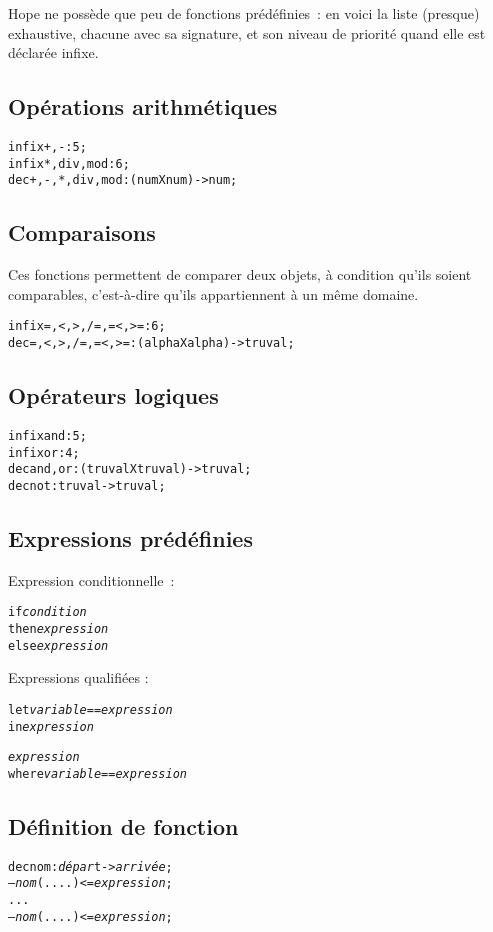 Hope ne possède que peu de fonctions prédéfinies~: en voici la liste
(presque) exhaustive, chacune avec sa signature, et son niveau de
priorité quand elle est déclarée infixe.

\subsection*{Opérations arithmétiques }
\begin{alltt}
infix + , -  : 5 ;
infix * , div , mod : 6 ;
dec + , - , * , div , mod  : (num X num) -> num ;
\end{alltt}

\subsection*{Comparaisons}
	Ces fonctions permettent de comparer deux objets, à
	condition qu'ils soient comparables, c'est-à-dire qu'ils
	appartiennent à un même domaine.
	
\begin{alltt}
infix = , < , > , /= , =< , >= : 6 ;
	dec  = , < , > , /= , =< , >= : (alpha X alpha) -> truval ;
\end{alltt}
\subsection*{Opérateurs logiques}
\begin{alltt}
infix and : 5 ;
infix or  : 4 ;
dec and, or : (truval X truval) -> truval ;
dec not : truval -> truval ;
\end{alltt}

\subsection*{Expressions prédéfinies}

Expression conditionnelle~:
\begin{alltt}
if \textit{condition}               
    then \textit{expression}  
    else \textit{expression} 	
\end{alltt}

Expressions qualifiées :
\begin{alltt}
let \textit{variable} == \textit{expression}  
    in \textit{expression}	

\textit{expression}
  where \textit{variable} == \textit{expression}
\end{alltt}

\subsection*{Définition de fonction}
\begin{alltt}
dec nom : \textit{dépar}t -> \textit{arrivée}  ;
--- \textit{nom} ( .... ) <= \textit{expression} ;
...
--- \textit{nom} ( .... ) <= \textit{expression} ;
\end{alltt}
